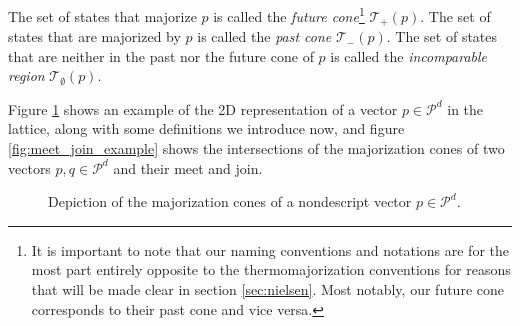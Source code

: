 \begin{definition}
    The set of states that majorize $p$ is called the \textit{future cone}\footnote{It is important to note that our naming conventions and notations are for the most part entirely opposite to the thermomajorization conventions for reasons that will be made clear in section \ref{sec:nielsen}. Most notably, our future cone corresponds to their past cone and vice versa.}  $\mathcal{T}_+ (p)$. The set of states that are majorized by $p$ is called the \textit{past cone} $\mathcal{T}_- (p)$. The set of states that are neither in the past nor the future cone of $p$ is called the \textit{incomparable region} $\mathcal{T}_\emptyset (p)$.
\end{definition}

Figure \ref{fig:maj_cones_example} shows an example of the 2D representation of a vector $p \in \mathcal{P}^d$ in the lattice, along with some definitions we introduce now, and figure \ref{fig:meet_join_example} shows the intersections of the majorization cones of two vectors $p, q \in \mathcal{P}^d$ and their meet and join.

\begin{figure}[h!]
    \centering
    \caption{Depiction of the majorization cones of a nondescript vector $p \in \mathcal{P}^d$.}
    \label{fig:maj_cones_example}
\end{figure}

